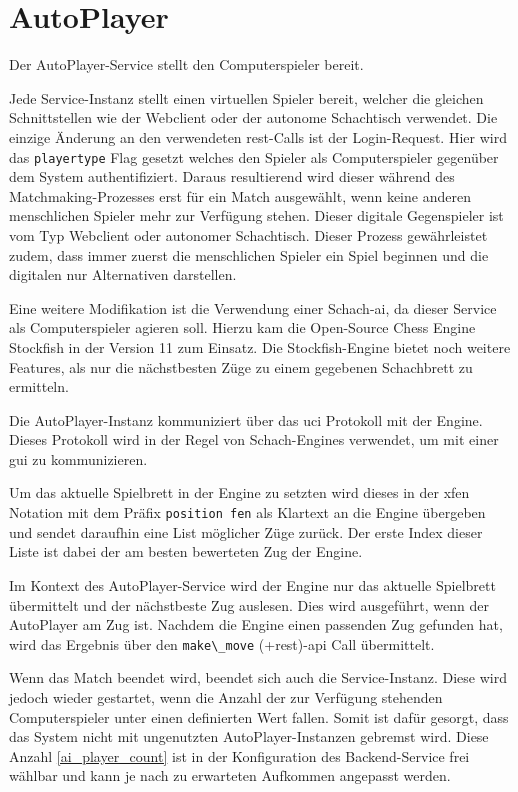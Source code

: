 \hypertarget{autoplayer}{%
\section{AutoPlayer}\label{autoplayer}}

Der AutoPlayer-Service stellt den Computerspieler bereit.

Jede Service-Instanz stellt einen virtuellen Spieler bereit, welcher die
gleichen Schnittstellen wie der Webclient oder der autonome Schachtisch
verwendet. Die einzige Änderung an den verwendeten \gls{rest}-Calls ist
der Login-Request. Hier wird das \passthrough{\lstinline!playertype!}
Flag gesetzt welches den Spieler als Computerspieler gegenüber dem
System authentifiziert. Daraus resultierend wird dieser während des
Matchmaking-Prozesses erst für ein Match ausgewählt, wenn keine anderen
menschlichen Spieler mehr zur Verfügung stehen. Dieser digitale
Gegenspieler ist vom Typ Webclient oder autonomer Schachtisch. Dieser
Prozess gewährleistet zudem, dass immer zuerst die menschlichen Spieler
ein Spiel beginnen und die digitalen nur Alternativen darstellen.

Eine weitere Modifikation ist die Verwendung einer Schach-\gls{ai}, da
dieser Service als Computerspieler agieren soll. Hierzu kam die
Open-Source Chess Engine Stockfish\cite{stockfish} in der Version 11
zum Einsatz. Die Stockfish-Engine bietet noch weitere Features, als nur
die nächstbesten Züge zu einem gegebenen Schachbrett zu ermitteln.

Die AutoPlayer-Instanz kommuniziert über das \gls{uci}
Protokoll\cite{uciprotocol} mit der Engine. Dieses Protokoll wird in
der Regel von Schach-Engines verwendet, um mit einer \gls{gui} zu
kommunizieren.

Um das aktuelle Spielbrett in der Engine zu setzten wird dieses in der
\gls{xfen} Notation mit dem Präfix
\passthrough{\lstinline!position fen!} als Klartext an die Engine
übergeben und sendet daraufhin eine List möglicher Züge zurück. Der
erste Index dieser Liste ist dabei der am besten bewerteten Zug der
Engine.

Im Kontext des AutoPlayer-Service wird der Engine nur das aktuelle
Spielbrett übermittelt und der nächstbeste Zug auslesen. Dies wird
ausgeführt, wenn der AutoPlayer am Zug ist. Nachdem die Engine einen
passenden Zug gefunden hat, wird das Ergebnis über den
\passthrough{\lstinline!make\_move!} (+rest)-\gls{api} Call übermittelt.

Wenn das Match beendet wird, beendet sich auch die Service-Instanz.
Diese wird jedoch wieder gestartet, wenn die Anzahl der zur Verfügung
stehenden Computerspieler unter einen definierten Wert fallen. Somit ist
dafür gesorgt, dass das System nicht mit ungenutzten
AutoPlayer-Instanzen gebremst wird. Diese Anzahl \ref{ai_player_count}
ist in der Konfiguration des Backend-Service frei wählbar und kann je
nach zu erwarteten Aufkommen angepasst werden.


